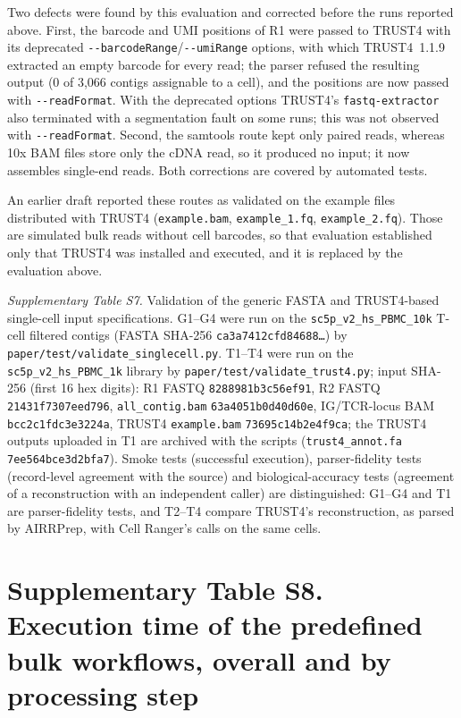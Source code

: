 \documentclass[11pt]{article}
\begin{document}
Two defects were found by this evaluation and corrected before the runs
reported above. First, the barcode and UMI positions of R1 were passed to
TRUST4 with its deprecated \texttt{-{}-barcodeRange}/\texttt{-{}-umiRange}
options, with which TRUST4~1.1.9 extracted an empty barcode for every read; the
parser refused the resulting output (0 of 3,066 contigs assignable to a cell),
and the positions are now passed with \texttt{-{}-readFormat}. With the
deprecated options TRUST4's \texttt{fastq-extractor} also terminated with a
segmentation fault on some runs; this was not observed with
\texttt{-{}-readFormat}. Second, the samtools route kept only paired reads,
whereas 10x BAM files store only the cDNA read, so it produced no input; it now
assembles single-end reads. Both corrections are covered by automated tests.

An earlier draft reported these routes as validated on the example files
distributed with TRUST4 (\texttt{example.bam}, \texttt{example\_1.fq},
\texttt{example\_2.fq}). Those are simulated bulk reads without cell barcodes, so
that evaluation established only that TRUST4 was installed and executed, and it
is replaced by the evaluation above.

{\small\textit{Supplementary Table S7.} Validation of the generic FASTA and
TRUST4-based single-cell input specifications. G1--G4 were run on the
\texttt{sc5p\_v2\_hs\_PBMC\_10k} T-cell filtered contigs (FASTA SHA-256
\texttt{ca3a7412cfd84688\ldots}) by \texttt{paper/test/validate\_singlecell.py}.
T1--T4 were run on the \texttt{sc5p\_v2\_hs\_PBMC\_1k} library by
\texttt{paper/test/validate\_trust4.py}; input SHA-256 (first 16 hex digits):
R1 FASTQ \texttt{8288981b3c56ef91}, R2 FASTQ \texttt{21431f7307eed796},
\texttt{all\_contig.bam} \texttt{63a4051b0d40d60e}, IG/TCR-locus BAM
\texttt{bcc2c1fdc3e3224a}, TRUST4 \texttt{example.bam}
\texttt{73695c14b2e4f9ca}; the TRUST4 outputs uploaded in T1 are archived with
the scripts (\texttt{trust4\_annot.fa} \texttt{7ee564bce3d2bfa7}). Smoke tests
(successful execution), parser-fidelity tests (record-level agreement with the
source) and biological-accuracy tests (agreement of a reconstruction with an
independent caller) are distinguished: G1--G4 and T1 are parser-fidelity tests,
and T2--T4 compare TRUST4's reconstruction, as parsed by AIRRPrep, with Cell
Ranger's calls on the same cells.\par}



\clearpage
\section*{Supplementary Table S8. Execution time of the predefined bulk workflows, overall and by processing step}
\end{document}
